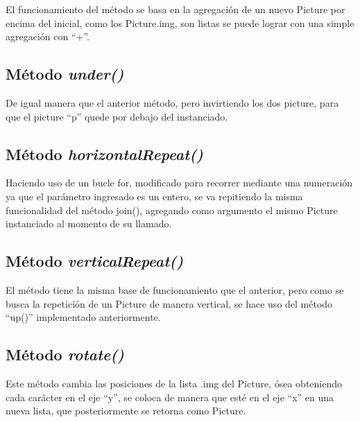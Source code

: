\documentclass{article}
\begin{document}
	El funcionamiento del método se basa en la agregación de un nuevo Picture por encima del inicial, como los Picture.img, son listas se puede lograr con una simple agregación con “+”.
	
	
	
	\subsection{Método \textit{under()}}
	
	De igual manera que el anterior método, pero invirtiendo los dos picture, para que el picture “p” quede por debajo del instanciado.
	
	
	
	\subsection{Método \textit{horizontalRepeat()}}
	
	Haciendo uso de un bucle for, modificado para recorrer mediante una numeración ya que el parámetro ingresado es un entero, se va repitiendo la misma funcionalidad del método join(), agregando como argumento el mismo Picture instanciado al momento de su llamado.
	
	
	
	\subsection{Método \textit{verticalRepeat()}}
	
	El método tiene la misma base de funcionamiento que el anterior, pero como se busca la repetición de un Picture de manera vertical, se hace uso del método “up()” implementado anteriormente.
	
	
	
	\subsection{Método \textit{rotate()}}
	
	Este método cambia las posiciones de la lista .img del Picture, ósea obteniendo cada carácter en el eje “y”, se coloca de manera que esté en el eje “x” en una nueva lista, que posteriormente se retorna como Picture.
	
\end{document}
